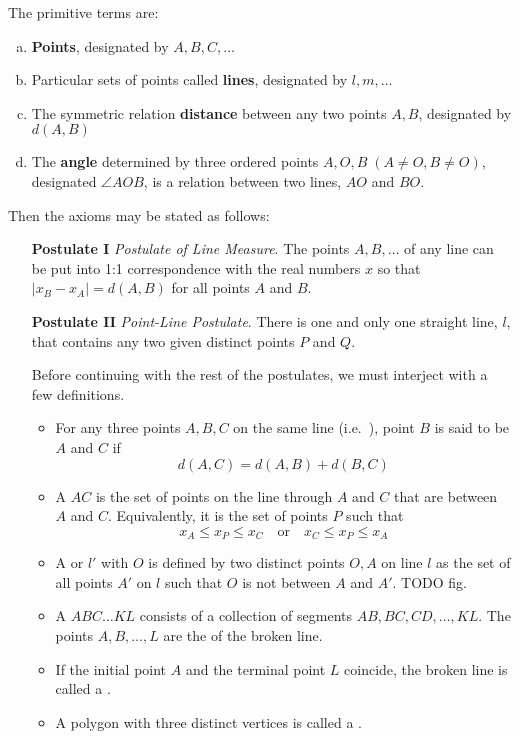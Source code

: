 The primitive terms are:
\begin{enumerate}[(a)]
\item \textbf{Points}, designated by $A,B,C, \ldots$
\item Particular sets of points called \textbf{lines}, designated by $l,m, \ldots$
\item The symmetric relation \textbf{distance} between any two points $A,B$, designated by $d(A,B)$
\item The \textbf{angle} determined by three ordered points $A,O,B \;(A\neq O, B\neq O)$, designated $\angle AOB$, is a relation between two lines, $AO$ and $BO$.
\end{enumerate}
Then the axioms may be stated as follows:
\begin{enumerate}
\item[\textbf{Postulate I}] \textit{Postulate of Line Measure}. The points $A, B, \ldots$ of any line can be put into 1:1 correspondence with the real numbers $x$ so that $|x_B - x_A| = d(A, B)$ for all points $A$ and $B$. 
\item[\textbf{Postulate II}] \textit{Point-Line Postulate}. There is one and only one straight line, $l$, that contains any two given distinct points $P$ and $Q$.

\begin{definition}
Before continuing with the rest of the postulates, we must interject with a few definitions.
\begin{itemize}
\item For any three points $A,B,C$ on the same line (i.e.\ ), point $B$ is said to be  $A$ and $C$ if
\[ d(A,C) = d(A,B) + d(B,C) \]
\item A  $AC$ is the set of points on the line through $A$ and $C$ that are between $A$ and $C$. Equivalently, it is the set of points $P$ such that
\[ x_A \leq x_P \leq x_C \quad \text{or} \quad x_C \leq x_P \leq x_A \]
\item A  or  $l'$ with  $O$ is defined by two distinct points $O,A$ on line $l$ as the set of all points $A'$ on $l$ such that $O$ is not between $A$ and $A'$. TODO fig.
\item A  $ABC\ldots KL$ consists of a collection of segments $AB, BC, CD, \ldots, KL$. The points $A,B, \ldots, L$ are the  of the broken line.
\item If the initial point $A$ and the terminal point $L$ coincide, the broken line is called a .
\item A polygon with three distinct vertices is called a .
\end{itemize}
\end{definition}


\end{enumerate}
